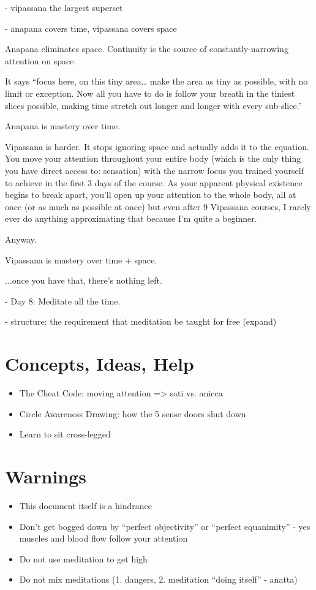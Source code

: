 \documentclass[a4paper, amsfonts, amssymb, amsmath, reprint, showkeys, nofootinbib, twoside]{revtex4-1}
\begin{document}
- vipassana the largest superset

- anapana covers time, vipassana covers space

Anapana eliminates space. Continuity is the source of constantly-narrowing attention on space.

It says “focus here, on this tiny area… make the area as tiny as possible, with no
limit or exception. Now all you have to do is follow your breath in the tiniest
slices possible, making time stretch out longer and longer with every sub-slice.”


Anapana is mastery over time.

Vipassana is harder. It stops ignoring space and actually adds it to the equation. You move your attention throughout your entire body (which is the only thing you have direct access to: sensation) with the narrow focus you trained yourself to achieve in the first 3 days of the course. As your apparent physical existence begins to break apart, you’ll open up your attention to the whole body, all at once (or as much as possible at once) but even after 9 Vipassana courses, I rarely ever do anything approximating that because I’m quite a beginner. 🙂

Anyway.

Vipassana is mastery over time + space.

...once you have that, there’s nothing left.

- Day 8: Meditate all the time.

- structure: the requirement that meditation be taught for free (expand)


\section{Concepts, Ideas, Help}

\begin{itemize}
  \item The Cheat Code: moving attention => sati vs. anicca
  \item Circle Awareness Drawing: how the 5 sense doors shut down
  \item Learn to sit cross-legged
\end{itemize}


\section{Warnings}

\begin{itemize}
  \item This document itself is a hindrance
  \item Don't get bogged down by ``perfect objectivity'' or ``perfect equanimity'' - yes muscles and blood flow follow your attention
  \item Do not use meditation to get high
  \item Do not mix meditations (1. dangers, 2. meditation ``doing itself'' - anatta)
\end{itemize}
\end{document}
